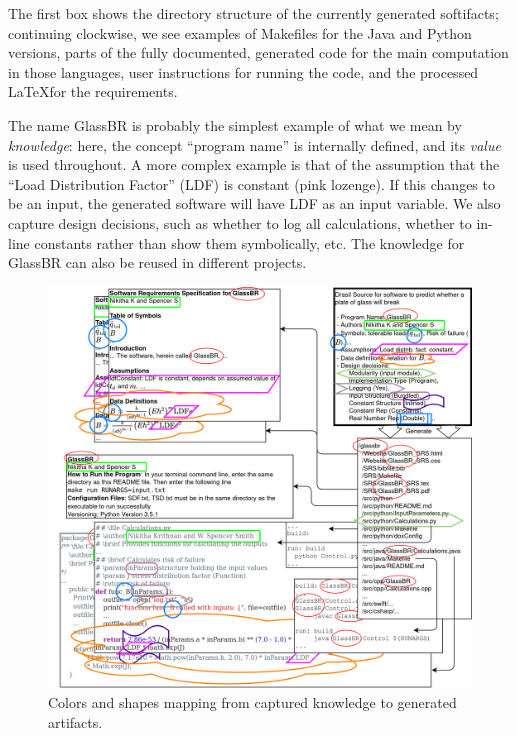 \documentclass[sigconf,review,anonymous=false]{acmart}
\begin{document}
The first box shows the directory structure of the currently generated
softifacts; continuing clockwise, we see examples of Makefiles for
the Java and Python versions, parts of the fully documented, 
generated code for the main computation in those languages, user
instructions for running the code, and the processed \LaTeX for the
requirements.

The name GlassBR is probably the simplest example of what we mean by
\emph{knowledge}: here, the concept ``program name'' is internally defined, and
its \emph{value} is used throughout. A more complex example is that
of the assumption that the ``Load Distribution Factor'' (LDF) is constant
(pink lozenge). If this changes to be an input, the generated software
will have LDF as an input variable.  We also capture design decisions,
such as whether to log all calculations, whether to in-line constants rather
than show them symbolically, etc. The knowledge for GlassBR can also be reused
in different projects.

\begin{figure}[h]
  \centering
  \includegraphics[width=\linewidth]{assets/DrasilSupportsChange-right-portrait-overlapped-ungrouped-11ptFont-squished-v1-300dpi.png}
  \caption{Colors and shapes mapping from captured knowledge to generated
  artifacts.}
  \label{Fig_DrasilAndChange}
\end{figure}
\end{document}

